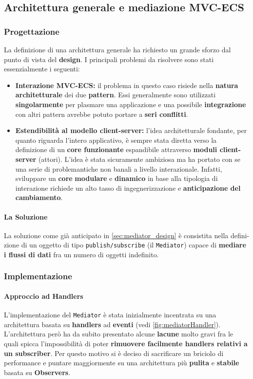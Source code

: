 \subsection{Architettura generale e mediazione MVC-ECS}
\label{subsec:arc_mediator}
\subsubsection{Progettazione}
La definizione di una architettura generale ha richiesto un grande sforzo dal punto di vista del \textbf{design}. I principali problemi da risolvere sono stati essenzialmente i seguenti:
\begin{itemize}
	\item{\textbf{Interazione MVC-ECS:}} il problema in questo caso risiede nella \textbf{natura architetturale} dei due \textbf{pattern}. Essi generalmente sono utilizzati \textbf{singolarmente} per plasmare una applicazione e una possibile \textbf{integrazione} con altri pattern avrebbe potuto portare a \textbf{seri conflitti}.
	\item{\textbf{Estendibilità al modello client-server:}} l'idea architetturale fondante, per quanto riguarda l'intero applicativo, è sempre stata diretta verso la definizione di un \textbf{core funzionante} espandibile attraverso \textbf{moduli client-server} (attori). L'idea è stata sicuramente ambiziosa ma ha portato con se una serie di problemantiche non banali a livello interazionale. Infatti, sviluppare un \textbf{core} \textbf{modulare} e \textbf{dinamico} in base alla tipologia di interazione richiede un alto tasso di ingegnerizzazione e \textbf{anticipazione del cambiamento}.
\end{itemize}
\paragraph{La Soluzione}
La soluzione come già anticipato in \ref{sec:mediator_design} è consistita nella defini-zione di un oggetto di tipo \texttt{publish/subscribe} (il \texttt{Mediator}) capace di \textbf{mediare i flussi di dati} fra un numero di oggetti indefinito.

\subsubsection{Implementazione}
\paragraph{Approccio ad Handlers}
L'implementazione del \texttt{Mediator} è stata inizialmente incentrata su una architettura basata su \textbf{handlers} ad \textbf{eventi} (vedi \ref{fig:mediatorHandler}). L'architettura però ha da subito presentato alcune \textbf{lacune} molto gravi fra le quali spicca l'impossibilità di poter \textbf{rimuovere facilmente handlers relativi a un subscriber}. Per questo motivo si è deciso di sacrificare un briciolo di performance e puntare maggiormente su una architettura più \textbf{pulita} e \textbf{stabile} basata su \textbf{Observers}.

